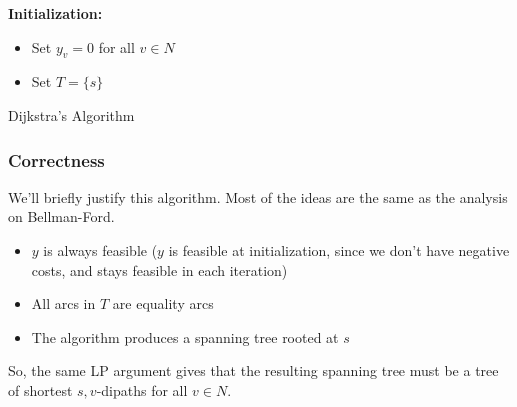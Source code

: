 \IncMargin{1em}
\begin{algorithm}[H]\label{alg:dijkstra}  
  \nl \textbf{Initialization:}
  \begin{itemize}
      \item Set $y_v = 0$ for all $v \in N$ 
      \item Set $T = \{s\}$
  \end{itemize}

  \nl {}

  \caption{Dijkstra's Algorithm}
\end{algorithm}

\subsubsection{Correctness}
We'll briefly justify this algorithm. Most of the ideas are the same as the analysis on Bellman-Ford. 
\begin{itemize}
    \item $y$ is always feasible ($y$ is feasible at initialization, since we don't have negative costs, and stays feasible in each iteration)
    \item All arcs in $T$ are equality arcs
    \item The algorithm produces a spanning tree rooted at $s$
\end{itemize}
So, the same LP argument gives that the resulting spanning tree must be a tree of shortest $s,v$-dipaths for all $v \in N$.

